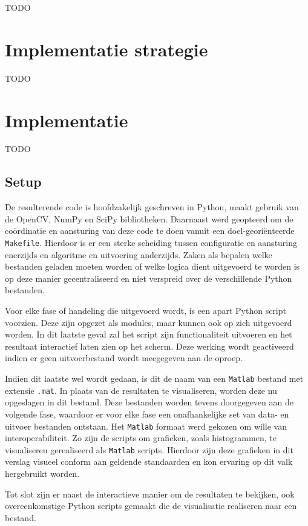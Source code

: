 \documentclass[10pt,a4paper]{article}
\begin{document}
TODO


\section{Implementatie strategie}

TODO

\section{Implementatie}

TODO

\subsection{Setup}

De resulterende code is hoofdzakelijk geschreven in Python, maakt gebruik van de OpenCV, NumPy en SciPy bibliotheken. Daarnaast werd geopteerd om de co\"ordinatie en aansturing van deze code te doen vanuit een doel-geori\"enteerde {\tt Makefile}. Hierdoor is er een sterke scheiding tussen configuratie en aansturing enerzijds en algoritme en uitvoering anderzijds. Zaken als bepalen welke bestanden geladen moeten worden of welke logica dient uitgevoerd te worden is op deze manier gecentraliseerd en niet verspreid over de verschillende Python bestanden.

Voor elke fase of handeling die uitgevoerd wordt, is een apart Python script voorzien. Deze zijn opgezet als modules, maar kunnen ook op zich uitgevoerd worden. In dit laatste geval zal het script zijn functionaliteit uitvoeren en het resultaat interactief laten zien op het scherm. Deze werking wordt geactiveerd indien er geen uitvoerbestand wordt meegegeven aan de oproep.

Indien dit laatste wel wordt gedaan, is dit de naam van een {\tt Matlab} bestand met extensie {\tt .mat}. In plaats van de resultaten te visualiseren, worden deze nu opgeslagen in dit bestand. Deze bestanden worden tevens doorgegeven aan de volgende fase, waardoor er voor elke fase een onafhankelijke set van data- en uitvoer bestanden ontstaan. Het {\tt Matlab} formaat werd gekozen om wille van interoperabiliteit. Zo zijn de scripts om grafieken, zoals histogrammen, te visualiseren gerealiseerd als {\tt Matlab} scripts. Hierdoor zijn deze grafieken in dit verslag visueel conform aan geldende standaarden en kon ervaring op dit valk hergebruikt worden.

Tot slot zijn er naast de interactieve manier om de resultaten te bekijken, ook overeenkomstige Python scripts gemaakt die de visualisatie realiseren naar een bestand.
\end{document}
